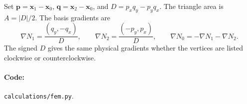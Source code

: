 \documentclass[11pt]{article}
\begin{document}
Set $\bm p=\bm x_1-\bm x_0$, $\bm q=\bm x_2-\bm x_0$, and
$D=p_xq_y-p_yq_x$. The triangle area is $A=|D|/2$. The basis gradients are
\begin{equation}
 \nabla N_1=\frac{(q_y,-q_x)}{D},\qquad
 \nabla N_2=\frac{(-p_y,p_x)}{D},\qquad
 \nabla N_0=-\nabla N_1-\nabla N_2 .
\end{equation}
The signed $D$ gives the same physical gradients whether the vertices are
listed clockwise or counterclockwise.

\paragraph{Code:} \texttt{calculations/fem.py}.
\end{document}
